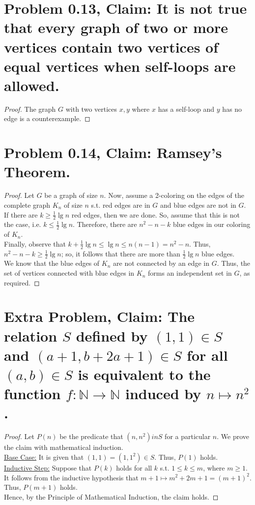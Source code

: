 \documentclass[12pt]{article}
\begin{document}
\section*{Problem 0.13, Claim: It is not true that every graph of two or more vertices contain two vertices of equal vertices when self-loops are allowed.}
\begin{proof}
The graph $G$ with two vertices $x, y$ where $x$ has a self-loop and $y$ has no edge is a counterexample.
\end{proof}

\section*{Problem 0.14, Claim: Ramsey's Theorem.}
\begin{proof}
	Let $G$ be a graph of size $n$. Now, assume a 2-coloring on the edges of the complete graph $K_{n}$ of size $n$ s.t. red edges are in $G$ and blue edges are not in $G$. \\
	\newline
	If there are $k \geq \frac{1}{2}\lg{n}$ red edges, then we are done. So, assume that this is not the case, i.e. $k \le \frac{1}{2}\lg{n}$. Therefore, there are $n^{2} - n - k$ blue edges in our coloring of $K_{n}$. \\
	\newline
	Finally, observe that $k + \frac{1}{2}\lg{n} \le \lg{n} \leq n(n - 1) = n^{2} - n$. Thus, $n^{2} - n - k \ge \frac{1}{2}\lg{n}$; so, it follows that there are more than $\frac{1}{2}\lg{n}$ blue edges. \\
	\newline
	We know that the blue edges of $K_{n}$ are not connected by an edge in $G$. Thus, the set of vertices connected with blue edges in $K_{n}$ forms an independent set in $G$, as required.
\end{proof}

\section*{Extra Problem, Claim: The relation $S$ defined by $(1, 1) \in S$ and $(a + 1, b + 2a + 1) \in S$ for all $(a, b) \in S$ is equivalent to the function $f: \mathbb{N} \rightarrow \mathbb{N}$ induced by $n \mapsto n^{2}$.}
\begin{proof}
	Let $P(n)$ be the predicate that $(n, n^{2}) in S$ for a particular $n$. We prove the claim with mathematical induction. \\
	\newline
	\underline{Base Case:} It is given that $(1, 1) = (1, 1^{2}) \in S$. Thus, $P(1)$ holds. \\
	\newline
	\underline{Inductive Step:} Suppose that $P(k)$ holds for all $k$ s.t. $1 \leq k \leq m$, where $m \geq 1$. It follows from the inductive hypothesis that $m + 1 \mapsto m^{2} + 2m + 1 = (m + 1)^{2}$. Thus, $P(m + 1)$ holds. \\
	\newline
	Hence, by the Principle of Mathematical Induction, the claim holds.
\end{proof}
\end{document}
